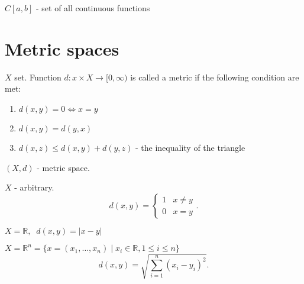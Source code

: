 $C[a, b]$ - set of all continuous functions

\section{Metric spaces}

\begin{definition}
    $X$ set. Function $d: x\times X \to [0, \infty)$ is called a metric if the following condition are met:
    \begin{enumerate}
        \item $d(x, y) = 0 \iff x = y$
        \item $d(x, y) = d(y, x)$
        \item $d(x,z) \leq d(x,y) + d(y, z)$ - the inequality of the triangle
    \end{enumerate}
\end{definition}
\begin{definition}
    $(X, d)$ - metric space.
\end{definition}
\begin{example}
    $X$ - arbitrary.
    \[
    d(x, y) = \begin{cases}
            1 & x \not= y \\
            0 & x = y
        \end{cases}
    .\] 
\end{example}
\begin{example}
    $X = \mathbb{R}, \;\; d(x, y) = \left| x - y \right| $
\end{example}
\begin{example}
    $X = \mathbb{R}^{n} = \{x = \left( x_1, \ldots, x_n \right) \mid x_i \in \mathbb{R}, 1 \leq i \leq n \} $
    \[
    d(x, y) = \sqrt{\sum_{i=1}^{n} \left( x_i - y_i \right)^2 } 
    .\] 
\end{example}

